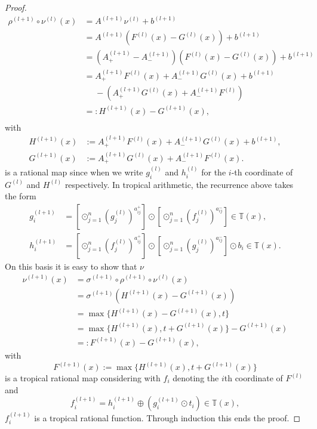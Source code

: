 \documentclass{article}
\theoremstyle{definition}
\begin{document}
\begin{proof}
\begin{align*}
\rho^{(l+1)} \circ \nu^{(l)}(x)
&= A^{(l+1)} \nu^{(l)} + b^{(l+1)} \\
&= A^{(l+1)}(F^{(l)}(x) - G^{(l)}(x)) + b^{(l+1)} \\
&=(A^{(l+1)}_{+} - A^{(l+1)}_{-})(F^{(l)}(x) - G^{(l)}(x)) + b^{(l+1)} \\
&=A_{+}^{(l+1)}F^{(l)}(x) + A_{-}^{(l+1)}G^{(l)}(x) + b^{(l+1)} \\ &\ \ \ \ \ \ -(A_{+}^{(l+1)}G^{(l)}(x) + A_{-}^{(l+1)}F^{(l)})\\
&=: H^{(l+1)}(x) - G^{(l+1)}(x), \\
\end{align*}
with
\begin{align*}
H^{(l+1)}(x) &:= A_{+}^{(l+1)}F^{(l)}(x) + A_{-}^{(l+1)}G^{(l)}(x) + b^{(l+1)}, \\
G^{(l+1)}(x) &:= A_{+}^{(l+1)}G^{(l)}(x) + A_{-}^{(l+1)}F^{(l)}(x).
\end{align*}
is a rational map since when we write $g_{i}^{(l)}$ and $h_{i}^{(l)}$ for the $i$-th coordinate of $G^{(l)}$ and $H^{(l)}$ respectively. In tropical arithmetic, the recurrence above takes the form
\begin{align*}
g_{i}^{(l+1)} &= [\odot^{n}_{j=1}(g_j^{(l)})^{a_{ij}^{+}}] \odot [\odot^{n}_{j=1}(f_j^{(l)})^{a_{ij}^{-}}] \in \mathbb{T}(x), \\
h_{i}^{(l+1)} &= [\odot^{n}_{j=1}(f_j^{(l)})^{a_{ij}^{+}}] \odot [\odot^{n}_{j=1}(g_j^{(l)})^{a_{ij}^{-}}] \odot b_{i} \in \mathbb{T}(x).
\end{align*}
On this basis it is easy to show that $\nu$
\begin{align*}
\nu^{(l+1)}(x) 
&= \sigma^{(l+1)} \circ \rho^{(l+1)} \circ \nu^{(l)}(x) \\
&= \sigma^{(l+1)} (H^{(l+1)}(x) - G^{(l+1)}(x)) \\
&= \max\{ H^{(l+1)}(x) - G^{(l+1)}(x), t\} \\
&= \max\{ H^{(l+1)}(x), t + G^{(l+1)}(x)\} - G^{(l+1)}(x) \\
&=: F^{(l+1)}(x) - G^{(l+1)}(x),
\end{align*}
with
$$F^{(l+1)}(x) := \max\{ H^{(l+1)}(x), t + G^{(l+1)}(x)\}$$
is a tropical rational map considering with $f_{i}$ denoting the $i$th coordinate of $F^{(l)}$ and
$$f_{i}^{(l+1)} = h_{i}^{(l+1)} \oplus (g_{i}^{(l+1)} \odot t_{i}) \in \mathbb{T}(x),$$
$f_{i}^{(l+1)}$ is a tropical rational function. Through induction this ends the proof.
\end{proof}
\end{document}
